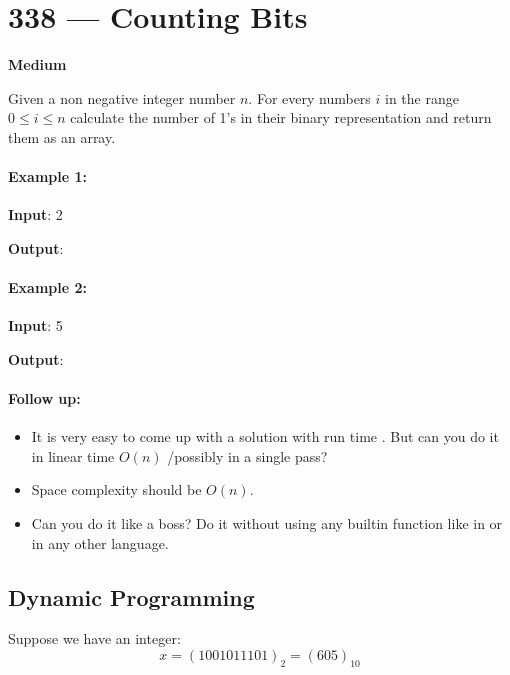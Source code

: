 \section{338 --- Counting Bits}

\textbf{Medium}

Given a non negative integer number $n$. For every numbers $i$ in the range $0 \leq i \leq n$ calculate the number of 1's in their binary representation and return them as an array.

\paragraph{Example 1:}

\begin{flushleft}
\textbf{Input}: 2

\textbf{Output}: \fcj{[0,1,1]}
\end{flushleft}

\paragraph{Example 2:}

\begin{flushleft}
\textbf{Input}: 5

\textbf{Output}: \fcj{[0,1,1,2,1,2]}
\end{flushleft}

\paragraph{Follow up:}

\begin{itemize}
\item It is very easy to come up with a solution with run time . But can you do it in linear time $O(n)$ /possibly in a single pass?
\item Space complexity should be $O(n)$.
\item Can you do it like a boss? Do it without using any builtin function like in  or in any other language.
\end{itemize}

\subsection{Dynamic Programming}

Suppose we have an integer:
\[
x = (1001011101)_2 = (605)_{10}
\]

